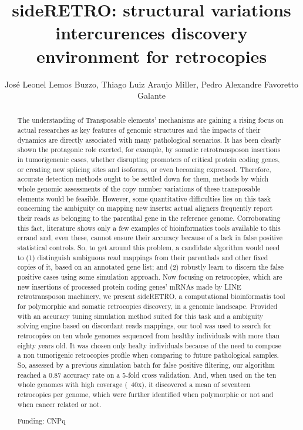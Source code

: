 \documentclass[twoside]{article}
\title{\vspace{-15mm}\fontsize{24pt}{10pt}\selectfont\textbf{ sideRETRO: structural variations intercurences discovery environment for retrocopies }} %
\author{ Jos\'e Leonel Lemos Buzzo, Thiago Luiz Araujo Miller, Pedro Alexandre Favoretto Galante }
\affil{ USP }
\date{}
\begin{document}
  
  
  \maketitle %
  
  
  \thispagestyle{fancy} %
  
  
  \begin{abstract}
  The understanding of Transposable elements' mechanisms are gaining a rising
focus on actual researches as key features of genomic structures and the
impacts of their dynamics are directly associated with many pathological
scenarios.
	It has been clearly shown the protagonic role exerted,  for example,  by
somatic retrotransposon insertions in tumorigenenic cases,  whether disrupting
promoters of critical protein coding genes,  or creating new splicing sites and
isoforms,  or even becoming expressed.
	Therefore,  accurate detection methods ought to be settled down for them, 
methods by which whole genomic assessments of the copy number variations of these
transposable elements would be feasible. However,  some quantitative difficulties
lies on this task concerning the ambiguity on mapping new inserts: actual
aligners frequently report their reads as belonging to the parenthal gene in the
reference genome. Corroborating this fact,  literature shows only a few examples
of bioinformatics tools available to this errand and,  even these,  cannot ensure
their accuracy because of a lack in false positive statistical controls. So,  to
get around this problem,  a candidate algorithm would need to (1) distinguish
ambiguous read mappings from their parenthals and other fixed copies of it, 
based on an annotated gene list; and (2) robustly learn to discern the false
positive cases using some simulation approach.
	Now focusing on retrocopies,  which are new insertions of processed protein
coding genes' mRNAs made by LINE retrotransposon machinery,  we present
sideRETRO,  a computational bioinformatis tool for polymorphic and somatic
retrocopies discovery,  in a genomic landscape. Provided with an accuracy
tuning simulation method suited for this task and a ambiguity solving engine
based on discordant reads mappings,  our tool was used to search for retrocopies
on ten whole genomes sequenced from healthy individuals with more than eighty
years old. It was chosen only healty individuals because of the need to compose
a non tumorigenic retrocopies profile when comparing to future pathological
samples.
	So,  assessed by a previous simulation batch for false positive filtering, 
our algorithm reached a 0.87 accuracy rate on a 5-fold cross validation. And, 
when used on the ten whole genomes with high coverage (~40x),  it discovered a
mean of seventeen retrocopies per genome,  which were further identified when
polymorphic or not and when cancer related or not.
  
  Funding: CNPq \\ 
  \end{abstract}
  
\end{document}
